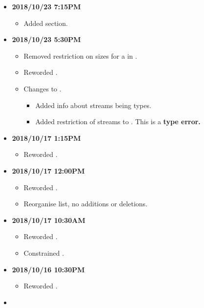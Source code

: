 \documentclass[../gazprea.tex]{subfiles}
\begin{document}
\begin{itemize}
\begin{itemize}
    \end{itemize}
  \item
    \textbf{2018/10/23 7:15PM}
    \begin{itemize}
      \item Added  section.
    \end{itemize}
  \item
    \textbf{2018/10/23 5:30PM}
    \begin{itemize}
      \item Removed restriction on sizes for a  in .
      \item Reworded .
      \item Changes to .
      \begin{itemize}
        \item Added info about streams being types.
        \item Added restriction of streams to .
          This is a \textbf{type error.}
      \end{itemize}
    \end{itemize}
  \item
    \textbf{2018/10/17 1:15PM}
    \begin{itemize}
      \item Reworded .
    \end{itemize}
  \item
    \textbf{2018/10/17 12:00PM}
    \begin{itemize}
      \item Reworded .
      \item Reorganise  list, no additions or deletions.
    \end{itemize}
  \item
    \textbf{2018/10/17 10:30AM}
    \begin{itemize}
      \item Reworded .
      \item Constrained  .
    \end{itemize}
  \item
    \textbf{2018/10/16 10:30PM}
    \begin{itemize}
      \item Reworded .
    \end{itemize}
  \item

\end{itemize}
\end{document}
